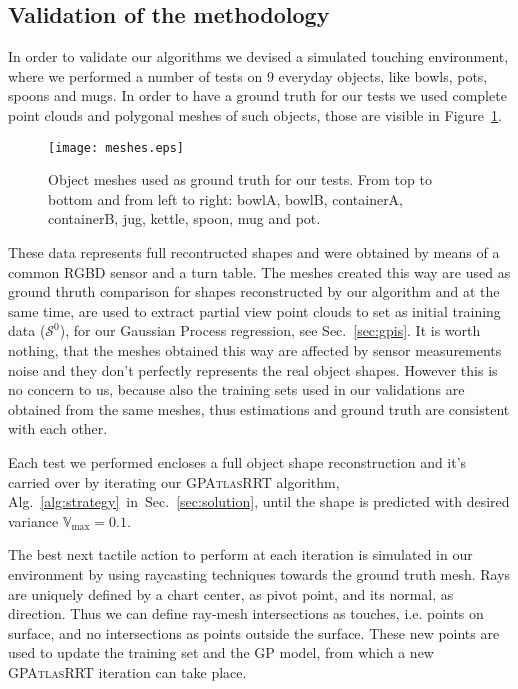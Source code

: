 \subsection{Validation of the methodology}

In order to validate our algorithms we devised a simulated touching environment,
where we performed a number of tests on 9 everyday objects, like bowls, pots, spoons and mugs.
In order to have a ground truth for our tests we used complete point clouds and polygonal meshes of
such objects, those are visible in Figure~\ref{fig:meshes}.

\begin{figure}[htb]
    \centering
    \texttt{[image: meshes.eps]}
    \caption{Object meshes used as ground truth for our tests. From top to bottom and from left
    to right: bowlA, bowlB, containerA, containerB, jug, kettle, spoon, mug and pot.}
    \label{fig:meshes}
\end{figure}

These data represents full recontructed shapes and were obtained by means of a common
RGBD sensor and a turn table. The meshes created this way are used as ground thruth 
comparison for shapes reconstructed by our algorithm and at the same time,
are used to extract  partial view point clouds to set as initial training
data ($\mathcal{S}^0$), for our Gaussian Process regression, see Sec.~\ref{sec:gpis}.
It is worth nothing, that the meshes obtained this way are affected by sensor measurements noise 
and they don't perfectly represents the real object shapes. However this is no concern to us, because also the
training sets used in our validations are obtained from the same meshes, thus estimations and ground truth are
consistent with each other.

Each test we performed encloses a full object shape reconstruction and it's carried over
by iterating our \textsc{GPAtlasRRT} algorithm, Alg.~\ref{alg:strategy}~in~Sec.~\ref{sec:solution},
until the shape is predicted with desired variance $\mathbb{V}_{\max} = 0.1$.

The best next tactile action to perform at each iteration is simulated in our
environment by using  raycasting techniques towards the ground truth mesh.
Rays are uniquely defined by a chart center, as pivot point, and its normal, as direction.
Thus we can define  ray-mesh intersections as touches, i.e. points on surface, and no intersections
as points outside the surface. These new points are used to update the training set
and the GP model, from which a new \textsc{GPAtlasRRT} iteration can take place. 

